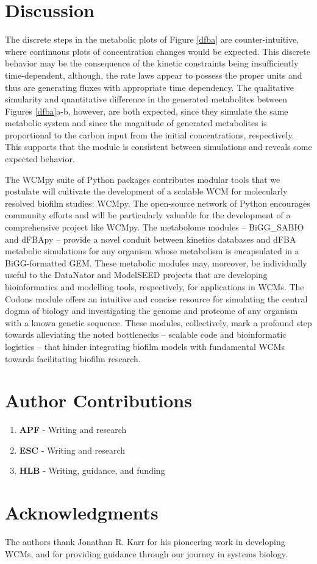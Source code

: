 \section{Discussion}
The discrete steps in the metabolic plots of Figure \ref{dfba} are counter-intuitive, where continuous plots of concentration changes would be expected. This discrete behavior may be the consequence of the kinetic constraints being insufficiently time-dependent, although, the rate laws appear to possess the proper units and thus are generating fluxes with appropriate time dependency. The qualitative simularity and quantitative difference in the generated metabolites between Figures \ref{dfba}a-b, however, are both expected, since they simulate the same metabolic system and since the magnitude of generated metabolites is proportional to the carbon input from the initial concentrations, respectively. This supports that the module is consistent between simulations and reveals some expected behavior.

The WCMpy suite of Python packages contributes modular tools that we postulate will cultivate the development of a scalable WCM for molecularly resolved biofilm studies: WCMpy. The open-source network of Python encourages community efforts and will be particularly valuable for the development of a comprehensive project like WCMpy. The metabolome modules -- BiGG\_SABIO and dFBApy -- provide a novel conduit between kinetics databases and dFBA metabolic simulations for any organism whose metabolism is encapsulated in a BiGG-formatted GEM. These metabolic modules may, moreover, be individually useful to the DataNator \cite{Roth2021Datanator:Behavior} and ModelSEED \cite{Seaver2021TheMicrobes} projects that are developing bioinformatics and modelling tools, respectively, for applications in WCMs. The Codons module offers an intuitive and concise resource for simulating the central dogma of biology and investigating the genome and proteome of any organism with a known genetic sequence. These modules, collectively, mark a profound step towards alleviating the noted bottlenecks -- scalable code and bioinformatic logistics -- that hinder integrating biofilm models with fundamental WCMs towards facilitating biofilm research. 

\section{Author Contributions}
\begin{enumerate}
    \item \textbf{APF} - Writing and research
    \item \textbf{ESC} - Writing and research
    \item \textbf{HLB} - Writing, guidance, and funding
\end{enumerate}

\section{Acknowledgments}
The authors thank Jonathan R. Karr for his pioneering work in developing WCMs, and for providing guidance through our journey in systems biology.

